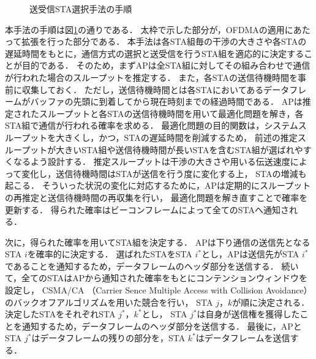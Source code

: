 \documentclass[master]{kuisthesis}		%
\newcommand{\sij}{(i,j)}
\def\coloneqq{\mathrel{\mathop:}=}
\newcommand{\sijk}{(i,j,k)}
\newcommand{\rijk}{r^{(i,j,k)}}
\begin{document}
				\begin{figure}[t]
					\centering
					\caption{送受信STA選択手法の手順}
					\label{fig:process}
				\end{figure}
				本手法の手順は図\ref{fig:process}の通りである．
				太枠で示した部分が，OFDMAの適用にあたって拡張を行った部分である．
				本手法は各STA組毎の干渉の大きさや各STAの遅延時間をもとに，通信方式の選択と送受信を行うSTA組を適応的に決定することが目的である．
				そのため，まずAPは全STA組に対してその組み合わせで通信が行われた場合のスループットを推定する．
				また，各STAの送信待機時間を事前に収集しておく．
				ただし，送信待機時間とは各STAにおいてあるデータフレームがバッファの先頭に到着してから現在時刻までの経過時間である．
				APは推定されたスループットと各STAの送信待機時間を用いて最適化問題を解き，各STA組で通信が行われる確率を求める．
				最適化問題の目的関数は，システムスループットを大きくし，かつ，STAの遅延時間を削減するため，
				前述の推定スループットが大きいSTA組や送信待機時間が長いSTAを含むSTA組が選ばれやすくなるよう設計する．
				推定スループットは干渉の大きさや用いる伝送速度によって変化し，送信待機時間はSTAが送信を行う度に変化する上，
				STAの増減も起こる．
				そういった状況の変化に対応するために，APは定期的にスループットの再推定と送信待機時間の再収集を行い，
				最適化問題を解き直すことで確率を更新する．
				得られた確率はビーコンフレームによって全てのSTAへ通知される．
				\par
				次に，得られた確率を用いてSTA組を決定する．
				APは下り通信の送信先となるSTA $i$を確率的に決定する．
				選ばれたSTAをSTA $i^*$とし，APは送信先がSTA $i^*$であることを通知するため，データフレームのヘッダ部分を送信する．
				続いて，全てのSTAはAPから通知された確率をもとにコンテンションウィンドウを設定し，
				CSMA/CA （Carrier Sence Multiple Access with Collision Avoidance）のバックオフアルゴリズムを用いた競合を行い，
				STA $j$，$k$が順に決定される．
				決定したSTAをそれぞれSTA $j^*$，$k^*$とし，
				STA $j^*$は自身が送信権を獲得したことを通知するため，データフレームのヘッダ部分を送信する．
				最後に，APとSTA $j^*$はデータフレームの残りの部分を，STA $k^*$はデータフレームを送信する．
\end{document}
